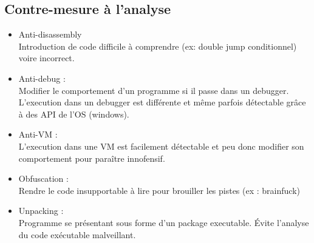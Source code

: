 \documentclass[a4paper]{article}
\begin{document}
\subsection{Contre-mesure à l'analyse}
\begin{itemize}[label = \textbullet, font = \Large]
    \item Anti-disassembly\\
    Introduction de code difficile à comprendre (ex: double jump conditionnel) voire incorrect.
    \item Anti-debug :\\
    Modifier le comportement d'un programme si il passe dans un debugger. L'execution dans un debugger est différente et même parfois détectable grâce à des API de l'OS (windows).
    \item Anti-VM : \\
    L'execution dans une VM est facilement détectable et peu donc modifier son comportement pour paraître innofensif.
    \item Obfuscation : \\
    Rendre le code insupportable à lire pour brouiller les pistes (ex : brainfuck)
    \item Unpacking : \\
    Programme se présentant sous forme d'un package executable. Évite l'analyse du code exécutable malveillant.
\end{itemize}




\newpage
\end{document}
